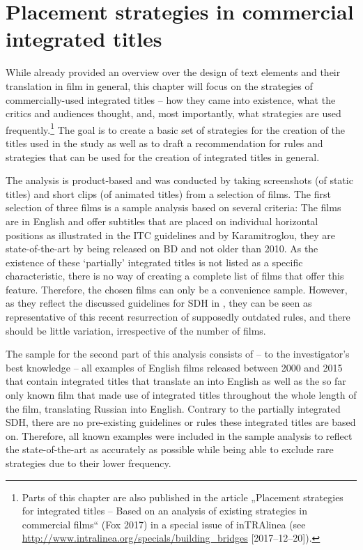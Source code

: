 \chapter{Placement strategies in commercial integrated titles}\label{placement}

While  already provided an overview over the design of text elements and their translation in film in general, this chapter will focus on the  strategies of commercially-used integrated titles – how they came into existence, what the critics and audiences thought, and, most importantly, what  strategies are used frequently.\footnote{Parts of this chapter are also published in the article „Placement strategies for integrated titles – Based on an analysis of existing strategies in commercial films“ (Fox 2017) in a special issue of inTRAlinea (see \url{http://www.intralinea.org/specials/building_bridges} [2017--12--20]).} The goal is to create a basic set of strategies for the creation of the titles used in the study as well as to draft a recommendation for rules and strategies that can be used for the creation of integrated titles in general.

The analysis is product-based and was conducted by taking screenshots (of static titles) and short clips (of animated titles) from a selection of films. The first selection of three films is a sample analysis based on several criteria: The films are in English and offer subtitles that are placed on individual horizontal positions as illustrated in the ITC guidelines and by Karamitroglou, they are state-of-the-art by being released on BD and not older than 2010. As the existence of these ‘partially’ integrated titles is not listed as a specific characteristic, there is no way of creating a complete list of films that offer this feature. Therefore, the chosen films can only be a convenience sample. However, as they reflect the discussed guidelines for SDH in , they can be seen as representative of this recent resurrection of supposedly outdated rules, and there should be little variation, irrespective of the number of films.

The sample for the second part of this analysis consists of – to the investigator’s best knowledge – all examples of English films released between 2000 and 2015 that contain integrated titles that translate an  into English as well as the so far only known film that made use of integrated titles throughout the whole length of the film, translating Russian into English. Contrary to the partially integrated SDH, there are no pre-existing guidelines or rules these integrated titles are based on. Therefore, all known examples were included in the sample analysis to reflect the state-of-the-art as accurately as possible while being able to exclude rare strategies due to their lower frequency.

